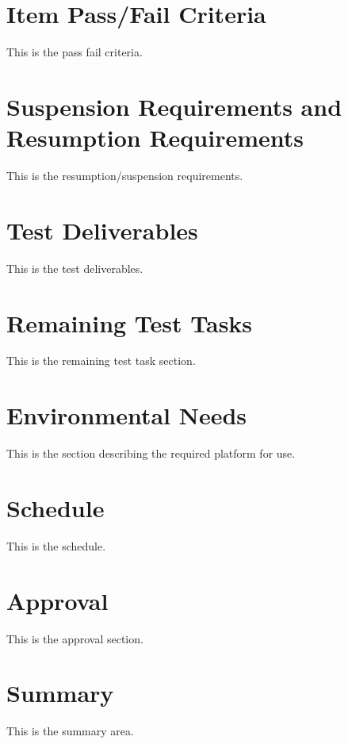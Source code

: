\documentclass{article}
\begin{document}
\section*{Item Pass/Fail Criteria}
This is the pass fail criteria.

\section*{Suspension Requirements and Resumption Requirements}
This is the resumption/suspension requirements.

\section*{Test Deliverables}
This is the test deliverables.

\section*{Remaining Test Tasks}
This is the remaining test task section.

\section*{Environmental Needs}
This is the section describing the required platform for use.

\section*{Schedule}
This is the schedule.

\section*{Approval}
This is the approval section.

\section*{Summary}
This is the summary area.
\end{document}
